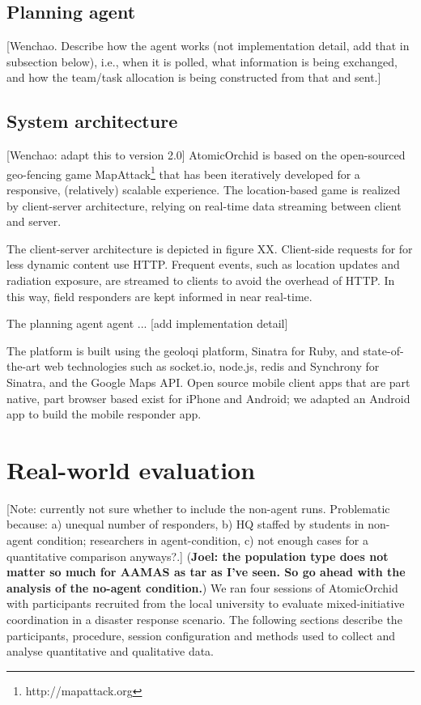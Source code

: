 \subsection{Planning agent}
[Wenchao. Describe how the agent works (not implementation detail, add that in subsection below), i.e., when it is polled, what information is being exchanged, and how the team/task allocation is being constructed from that and sent.]

\subsection{System architecture}
[Wenchao: adapt this to version 2.0] AtomicOrchid is based on the open-sourced geo-fencing game MapAttack\footnote{http://mapattack.org} that has been iteratively developed for a responsive, (relatively) scalable experience.  The location-based game is realized by client-server architecture, relying on real-time data streaming between client and server.

The client-server architecture is depicted in figure XX. Client-side requests for for less dynamic content use HTTP. Frequent events, such as location updates and radiation exposure, are streamed to clients to avoid the overhead of HTTP. In this way, field responders are kept informed in near real-time.

The planning agent agent ... [add implementation detail]

The platform is built using the geoloqi platform, Sinatra for Ruby, and state-of-the-art web technologies such as socket.io, node.js, redis and Synchrony for Sinatra, and the Google Maps API. Open source mobile client apps that are part native, part browser based exist for iPhone and Android; we adapted an Android app to build the mobile responder app.

\section{Real-world evaluation}
[Note: currently not sure whether to include the non-agent runs. Problematic because: a) unequal number of responders, b) HQ staffed by students in non-agent condition; researchers in agent-condition, c) not enough cases for a quantitative comparison anyways?.]
(\textbf{Joel: the population type does not matter so much for AAMAS as tar as I've seen. So go ahead with the analysis of the no-agent condition.})
We ran four sessions of AtomicOrchid with participants recruited from the local university to evaluate mixed-initiative coordination in a disaster response scenario. The following sections describe the participants, procedure, session configuration and methods used to collect and analyse quantitative and qualitative data.


